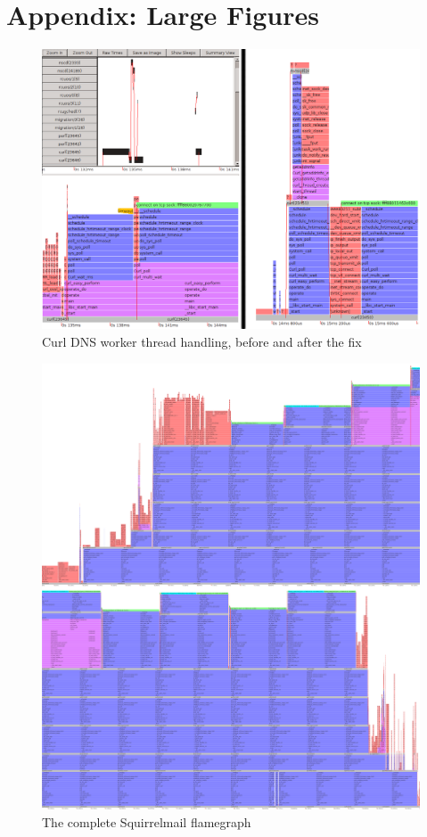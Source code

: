 \documentclass[10pt]{article}
\begin{document}
\onecolumn
\newpage

\section{Appendix: Large Figures}

\vspace{1in}

\begin{figure}[h]
\includegraphics[width=6.5in]{images/curlBeforeAndAfter}
\caption{Curl DNS worker thread handling, before and after the fix}
\label{fig:curl}
\end{figure}

\begin{figure}[p]
\includegraphics[width=6.5in]{images/squirrelbest}
\caption{The complete Squirrelmail flamegraph}
\label{fig:sq}
\end{figure}
\end{document}

